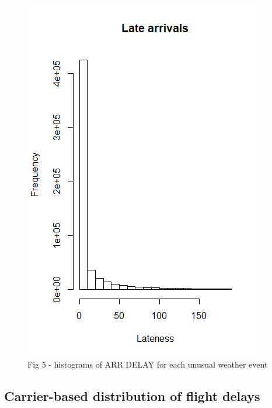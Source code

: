 \documentclass[12pt, a4paper]{book}
\begin{document}
	 		\begin{figure}[h]
	 		\includegraphics[width = .75 \textwidth]{../figures/LateArrivalsHistogram}
	 		\caption{Fig 5 - histograms of ARR DELAY for each unusual weather event}
	 		\end{figure}
		\subsection{Carrier-based distribution of flight delays}
			
\end{document}
